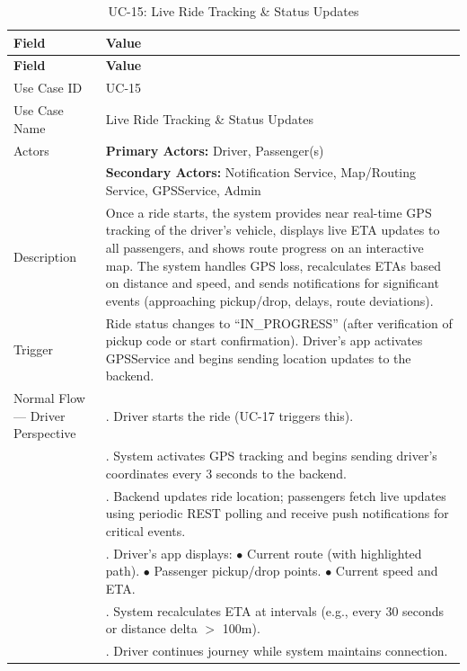 \begin{longtable}{|>{\raggedright\arraybackslash}p{4cm}|>{\raggedright\arraybackslash}p{11cm}|}
\caption{UC-15: Live Ride Tracking \& Status Updates}
\label{tab:uc-15} \\
\hline
\rowcolor{lightgray!30}
\textbf{Field} & \textbf{Value} \\
\hline
\endfirsthead
\hline
\rowcolor{lightgray!30}
\textbf{Field} & \textbf{Value} \\
\hline
\endhead
\hline
\endfoot
\hline
\endlastfoot
Use Case ID & UC-15 \\
\hline
Use Case Name & Live Ride Tracking \& Status Updates \\
\hline
Actors & \textbf{Primary Actors:} Driver, Passenger(s) \\
& \textbf{Secondary Actors:} Notification Service, Map/Routing Service, GPSService, Admin \\
\hline
Description & Once a ride starts, the system provides near real-time GPS tracking of the driver's vehicle, displays live ETA updates to all passengers, and shows route progress on an interactive map. The system handles GPS loss, recalculates ETAs based on distance and speed, and sends notifications for significant events (approaching pickup/drop, delays, route deviations). \\
\hline
Trigger & Ride status changes to ``IN\_PROGRESS'' (after verification of pickup code or start confirmation). Driver's app activates GPSService and begins sending location updates to the backend. \\
\hline
Normal Flow — Driver Perspective & 1. Driver starts the ride (UC-17 triggers this). \\
& 2. System activates GPS tracking and begins sending driver's coordinates every 3 seconds to the backend. \\
& 3. Backend updates ride location; passengers fetch live updates using periodic REST polling and receive push notifications for critical events. \\
& 4. Driver's app displays: \newline $\bullet$ Current route (with highlighted path). \newline $\bullet$ Passenger pickup/drop points. \newline $\bullet$ Current speed and ETA. \\
& 5. System recalculates ETA at intervals (e.g., every 30 seconds or distance delta $>$ 100m). \\
& 6. Driver continues journey while system maintains connection. \\

\end{longtable}
